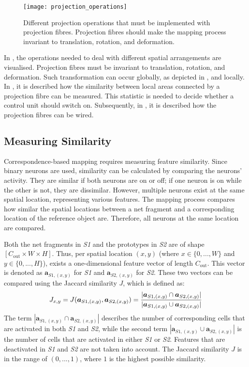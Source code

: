 \begin{figure}[h]
    \centering
    \texttt{[image: projection\_operations]}
    \caption[Different projection operation]{Different projection operations that must be implemented with projection fibres. Projection fibres should make the mapping process invariant to translation, rotation, and deformation.}
\end{figure}
In , the operations needed to deal with different spatial arrangements are visualised.
Projection fibres must be invariant to translation, rotation, and deformation. Such transformation can occur globally, as depicted in , and locally.
In , it is described how the similarity between local areas connected by a projection fibre can be measured. This statistic is needed to decide whether a control unit should switch on. Subsequently, in , it is described how the projection fibres can be wired.

\subsection{Measuring Similarity}
Correspondence-based mapping requires measuring feature similarity.
Since binary neurons are used, similarity can be calculated by comparing the neurons' activity. They are similar if both neurons are on or off; if one neuron is on while the other is not, they are dissimilar.
However, multiple neurons exist at the same spatial location, representing various features.
The mapping process compares how similar the spatial locations between a net fragment and a corresponding location of the reference object are.
Therefore, all neurons at the same location are compared.

Both the net fragments in \emph{S1} and the prototypes in \emph{S2} are of shape $[C_{\text{out}} \times W \times H]$. Thus, per spatial location $(x,y)$ (where $x \in \{0, ..., W\}$ and $y \in \{0, ..., H\}$), exists a one-dimensional feature vector of length $C_{\text{out}}$. This vector is denoted as $\boldsymbol{a}_{S1,(x,y)}$ for \emph{S1} and $\boldsymbol{a}_{S2,(x,y)}$ for \emph{S2}.
These two vectors can be compared using the Jaccard similarity $J$, which is defined as:
%
\begin{align}\eqlbl{jaccard}
	J_{x,y} = J(\boldsymbol{a}_{S1,(x,y)}, \boldsymbol{a}_{S2,(x,y)}) = \frac{|\boldsymbol{a}_{S1,(x,y)} \cap \boldsymbol{a}_{S2,(x,y)}|}{|\boldsymbol{a}_{S1,(x,y)} \cup \boldsymbol{a}_{S2,(x,y)}|}
\end{align}
%
The term $|\boldsymbol{a}_{S1,(x,y)} \cap \boldsymbol{a}_{S2,(x,y)}|$ describes the number of corresponding cells that are activated in both \emph{S1} and \emph{S2}, while the second term $|\boldsymbol{a}_{S1,(x,y)} \cup \boldsymbol{a}_{S2,(x,y)}|$ is the number of cells that are activated in either \emph{S1} or \emph{S2}. Features that are deactivated in \emph{S1} and \emph{S2} are not taken into account.
The Jaccard similarity $J$ is in the range of $(0, ..., 1)$, where $1$ is the highest possible similarity.

